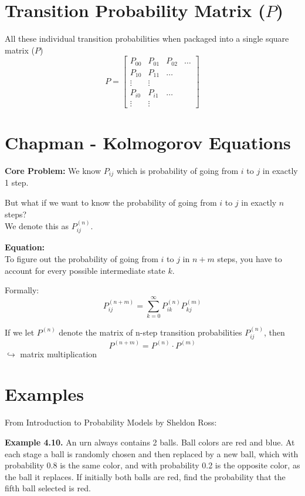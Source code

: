 \documentclass[12pt,a4paper]{article}
\begin{document}
\section*{\textcolor{secondary}{Transition Probability Matrix ($P$)}}
All these individual transition probabilities when packaged into a single square matrix ($P$)
\[ P = \begin{bmatrix} P_{00} & P_{01} & P_{02} & \dots \\ P_{10} & P_{11} & \dots \\ \vdots & \vdots \\ P_{i0} & P_{i1} & \dots \\ \vdots & \vdots \end{bmatrix} \]

\vspace{0.5cm}

\section*{\textcolor{primary}{Chapman - Kolmogorov Equations}}
\textbf{\textcolor{secondary}{Core Problem:}} We know $P_{ij}$ which is probability of going from $i$ to $j$ in exactly 1 step.

But what if we want to know the probability of going from $i$ to $j$ in exactly $n$ steps?\\
We denote this as $P_{ij}^{(n)}$.

\textbf{\textcolor{secondary}{Equation:}} \\
To figure out the probability of going from $i$ to $j$ in $n+m$ steps, you have to account for every possible intermediate state $k$.

Formally:
\[ P_{ij}^{(n+m)} = \sum_{k=0}^{\infty} P_{ik}^{(n)} P_{kj}^{(m)} \]

If we let $P^{(n)}$ denote the matrix of n-step transition probabilities $P_{ij}^{(n)}$, then
\[ P^{(n+m)} = P^{(n)} \cdot P^{(m)} \]
$\hookrightarrow$ matrix multiplication

\section*{\textcolor{primary}{Examples}}
From Introduction to Probability Models by Sheldon Ross:

\textbf{Example 4.10.} An urn always contains 2 balls. Ball colors are red and blue. At each
stage a ball is randomly chosen and then replaced by a new ball, which with probability 0.8 is the same color, and with probability 0.2 is the opposite color, as the ball it
replaces. If initially both balls are red, find the probability that the fifth ball selected is
red.
\end{document}
